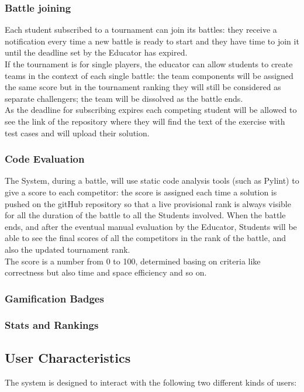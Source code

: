\documentclass{article}
\begin{document}
\subsubsection{Battle joining}
Each student subscribed to a tournament can join its battles: they receive a notification every time a new battle is ready to start and they have time to join it until the deadline set by the Educator has expired.\\
If the tournament is for single players, the educator can allow students to create teams in the context of each single battle: the team components will be assigned the same score but in the tournament ranking they will still be considered as separate challengers; the team will be dissolved as the battle ends.\\
As the deadline for subscribing expires each competing student will be allowed to see the link of the repository where they will find the text of the exercise with test cases and will upload their solution.
\newpage
\subsubsection{Code Evaluation}
The System, during a battle, will use static code analysis tools (such as Pylint) to give a score to each competitor: the score is assigned each time a solution is pushed on the gitHub repository so that a live provisional rank is always visible for all the duration of the battle to all the Students involved. 
When the battle ends, and after the eventual manual evaluation by the Educator, Students will be able to see the final scores of all the competitors in the rank of the battle, and also the updated tournament rank.\\
The score is a number from 0 to 100, determined basing on criteria like correctness but also time and space efficiency and so on.
\subsubsection{Gamification Badges}

\subsubsection{Stats and Rankings}


\subsection{User Characteristics}
The system is designed to interact with the following two different kinds of users:
\end{document}
